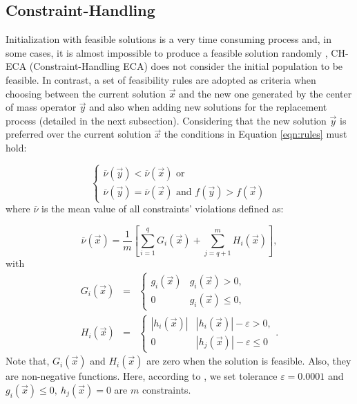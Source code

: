 \documentclass[conference]{IEEEtran}
\begin{document}
\subsection{Constraint-Handling} %
\label{sec:constraint_handling}

Initialization with feasible solutions is a very time consuming process and, in 
some cases, it is almost impossible to produce a feasible solution randomly 
\cite{castillofoundations}, CH-ECA (Constraint-Handling ECA) does not consider 
the initial population to be feasible. In contrast, a set of feasibility rules 
are adopted as criteria when choosing between the current solution $\vec{x}$ and 
the new one generated by the center of mass operator $\vec{y}$ and also when adding 
new solutions for the replacement process (detailed in the next subsection). 
Considering that the new solution $\vec{y}$ is preferred over the current solution 
$\vec{x}$ the conditions in Equation \ref{eqn:rules} must hold:

\begin{equation}
	\begin{cases}
	\overline{\nu}( \vec{y} ) < \overline{\nu}( \vec{x} )  \text{ or}\\
	\overline{\nu}( \vec{y} ) = \overline{\nu}( \vec{x} ) \text{ and } f(\vec{y}) > f(\vec{x})
	\end{cases}
	\label{eqn:rules}
\end{equation}
where $\overline{\nu}$ is the mean value of all constraints' violations defined as:

\begin{equation}
	\overline{\nu}( \vec{x} ) = \dfrac{1}{m} \left[ \sum_{i=1}^q G_i(\vec{x}) + \sum_{j=q+1}^m H_i(\vec{x}) \right],
	\label{eqn:nu}
\end{equation}
%
with 
\begin{eqnarray}
	G_i(\vec{x}) &=&
	\begin{cases}
		g_i(\vec{x})   & g_i(\vec{x}) > 0,  \\
		    0          & g_i(\vec{x}) \leq 0,
	\end{cases}
	\\
	H_i(\vec{x}) &=&
	\begin{cases}
		|h_i(\vec{x})|   & |h_i(\vec{x})| - \varepsilon  > 0,  \\
		    0            & |h_j(\vec{x})| - \varepsilon \leq 0
	\end{cases}
	.
\end{eqnarray}
%
Note that, $G_i(\vec{x})$ and $H_i(\vec{x})$ are zero when the solution is feasible. 
Also, they are non-negative functions. Here, according to \cite{cecCop17}, we set 
tolerance $\varepsilon = 0.0001$ and $g_i(\vec{x}) \leq 0,\ h_j(\vec{x}) = 0$ are 
$m$ constraints.\\
\end{document}
